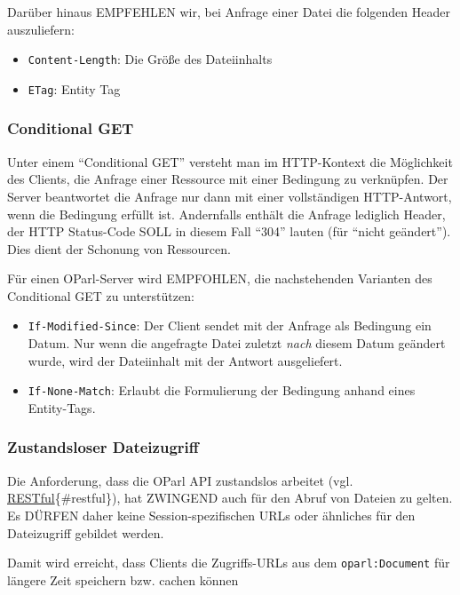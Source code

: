 \documentclass[,a4paper]{article}
\begin{document}
Darüber hinaus EMPFEHLEN wir, bei Anfrage einer Datei die folgenden
Header auszuliefern:

\begin{itemize}
\itemsep1pt\parskip0pt
\item
  \texttt{Content-Length}: Die Größe des Dateiinhalts
\item
  \texttt{ETag}: Entity Tag
\end{itemize}

\subsubsection{Conditional GET}\label{conditional-get}

Unter einem ``Conditional GET'' versteht man im HTTP-Kontext die
Möglichkeit des Clients, die Anfrage einer Ressource mit einer Bedingung
zu verknüpfen. Der Server beantwortet die Anfrage nur dann mit einer
vollständigen HTTP-Antwort, wenn die Bedingung erfüllt ist. Andernfalls
enthält die Anfrage lediglich Header, der HTTP Status-Code SOLL in
diesem Fall ``304'' lauten (für ``nicht geändert''). Dies dient der
Schonung von Ressourcen.

Für einen OParl-Server wird EMPFOHLEN, die nachstehenden Varianten des
Conditional GET zu unterstützen:

\begin{itemize}
\item
  \texttt{If-Modified-Since}: Der Client sendet mit der Anfrage als
  Bedingung ein Datum. Nur wenn die angefragte Datei zuletzt \emph{nach}
  diesem Datum geändert wurde, wird der Dateiinhalt mit der Antwort
  ausgeliefert.
\item
  \texttt{If-None-Match}: Erlaubt die Formulierung der Bedingung anhand
  eines Entity-Tags.
\end{itemize}

\subsubsection{Zustandsloser
Dateizugriff}\label{zustandsloser-dateizugriff}

Die Anforderung, dass die OParl API zustandslos arbeitet (vgl.
\hyperref[restful]{RESTful}\{\#restful\}), hat ZWINGEND auch für den
Abruf von Dateien zu gelten. Es DÜRFEN daher keine Session-spezifischen
URLs oder ähnliches für den Dateizugriff gebildet werden.

Damit wird erreicht, dass Clients die Zugriffs-URLs aus dem
\texttt{oparl:Document} für längere Zeit speichern bzw. cachen können
\end{document}
